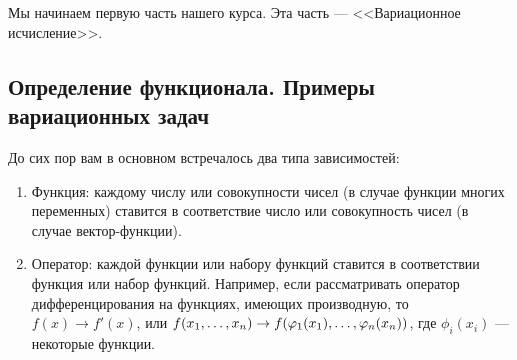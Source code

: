 \chapter{}
\label{lecture1}
Мы начинаем первую часть нашего курса. Эта часть --- <<Вариационное исчисление>>.
\section{Определение функционала. Примеры вариационных задач}
\label{lecture1section1}
До сих пор вам в основном встречалось два типа зависимостей:
\begin{enumerate}
	\item Функция: каждому числу или совокупности чисел (в случае функции многих переменных) ставится в соответствие число или совокупность чисел (в случае вектор-функции).
	
	\item Оператор: каждой функции или набору функций ставится в соответствии функция или набор функций. Например, если рассматривать оператор дифференцирования на функциях{\mb,} имеющих производную, то $f(x)\to f'(x)$, или $f(x_1,\ldots,x_n)\?\to f(\phi_1(x_1),\ldots,\phi_n(x_n))$, где $\phi_i(x_i)$ --- некоторые функции.
	
\end{enumerate}


